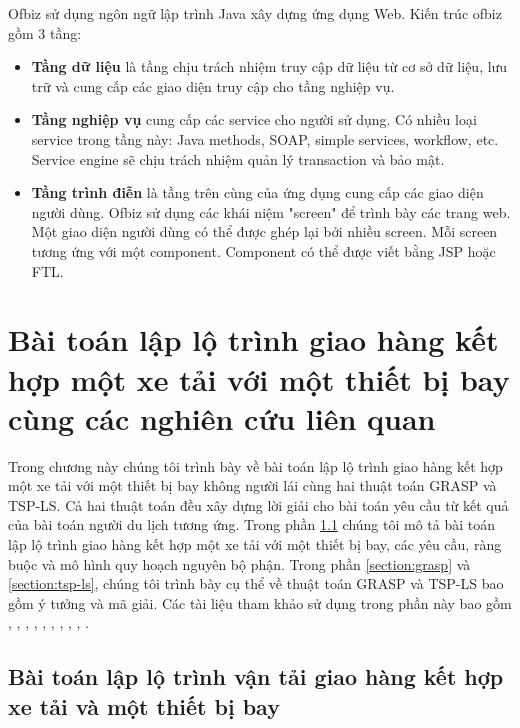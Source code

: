 \documentclass[a4paper,12pt]{report}
\begin{document}
Ofbiz sử dụng ngôn ngữ lập trình Java xây dựng ứng dụng Web. Kiến trúc ofbiz gồm 3 tầng: 
\begin{itemize}
\item \textbf{Tầng dữ liệu}  là tầng chịu trách nhiệm truy cập dữ liệu từ cơ sở dữ liệu, lưu trữ và cung cấp các giao diện truy cập cho tầng nghiệp vụ.

\item \textbf{Tầng nghiệp vụ} cung cấp các service cho người sử dụng. Có nhiều loại service trong tầng này: Java methods, \ac{SOAP}, simple services, workflow, etc. Service engine sẽ chịu trách nhiệm quản lý transaction và bảo mật.
\item \textbf{Tầng trình điễn} là tầng trên cùng của ứng dụng cung cấp các giao diện người dùng. Ofbiz sử dụng các khái niệm "screen" để trình bày các trang web. Một giao diện người dùng có thể được ghép lại bởi nhiều screen. Mỗi screen tương ứng với một component. Component có thể được viết bằng \ac{JSP} hoặc \ac{FTL}. 
\end{itemize}

\chapter{Bài toán lập lộ trình giao hàng  kết hợp một xe tải với  một thiết bị bay cùng các nghiên cứu liên quan }
Trong chương này chúng tôi trình bày về bài toán lập lộ trình giao hàng kết hợp một xe tải với một thiết bị bay không người lái cùng hai thuật toán \ac{GRASP} và TSP-LS. Cả hai thuật toán đều xây dựng lời giải cho bài toán yêu cầu từ kết quả của bài toán người du lịch tương ứng. Trong phần  \ref{section:tspd} chúng tôi mô tả bài toán lập lộ trình giao hàng kết hợp một xe tải với một thiết bị bay, các yêu cầu, ràng buộc và mô hình quy hoạch nguyên bộ phận. Trong phần \ref{section:grasp} và \ref{section:tsp-ls}, chúng tôi trình bày cụ thể về thuật toán \ac{GRASP} và TSP-LS bao gồm ý tưởng và mã giải. Các tài liệu tham khảo sử dụng trong phần này bao gồm \cite{main}, \cite{bahiwww} \cite{12}, \cite{13}, \cite{14}, \cite{15}, \cite{16}, \cite{17}, \cite{18}, \cite{19}, \cite{21}.
\section{Bài toán lập lộ trình vận tải giao hàng kết hợp xe tải và một thiết bị bay}
\label{section:tspd}
\end{document}
